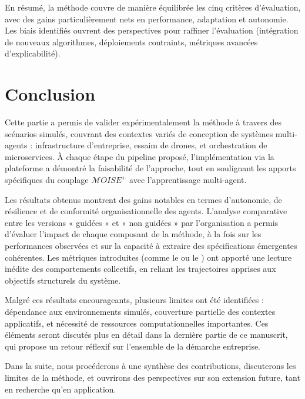 \medskip
En résumé, la méthode  couvre de manière équilibrée les cinq critères d’évaluation, avec des gains particulièrement nets en performance, adaptation et autonomie. Les biais identifiés ouvrent des perspectives pour raffiner l’évaluation (intégration de nouveaux algorithmes, déploiements contraints, métriques avancées d’explicabilité).

\clearpage
\thispagestyle{empty}
\null
\newpage


\chapter*{Conclusion}

Cette partie a permis de valider expérimentalement la méthode  à travers des scénarios simulés, couvrant des contextes variés de conception de systèmes multi-agents : infrastructure d’entreprise, essaim de drones, et orchestration de microservices. À chaque étape du pipeline proposé, l’implémentation via la plateforme  a démontré la faisabilité de l’approche, tout en soulignant les apports spécifiques du couplage $\mathcal{M}OISE^+$ avec l’apprentissage multi-agent.

Les résultats obtenus montrent des gains notables en termes d’autonomie, de résilience et de conformité organisationnelle des agents. L’analyse comparative entre les versions « guidées » et « non guidées » par l’organisation a permis d’évaluer l’impact de chaque composant de la méthode, à la fois sur les performances observées et sur la capacité à extraire des spécifications émergentes cohérentes. Les métriques introduites (comme le  ou le ) ont apporté une lecture inédite des comportements collectifs, en reliant les trajectoires apprises aux objectifs structurels du système.

Malgré ces résultats encourageants, plusieurs limites ont été identifiées : dépendance aux environnements simulés, couverture partielle des contextes applicatifs, et nécessité de ressources computationnelles importantes. Ces éléments seront discutés plus en détail dans la dernière partie de ce manuscrit, qui propose un retour réflexif sur l’ensemble de la démarche entreprise.

\vspace{1em}

\noindent
Dans la suite, nous procéderons à une synthèse des contributions, discuterons les limites de la méthode, et ouvrirons des perspectives sur son extension future, tant en recherche qu’en application.
